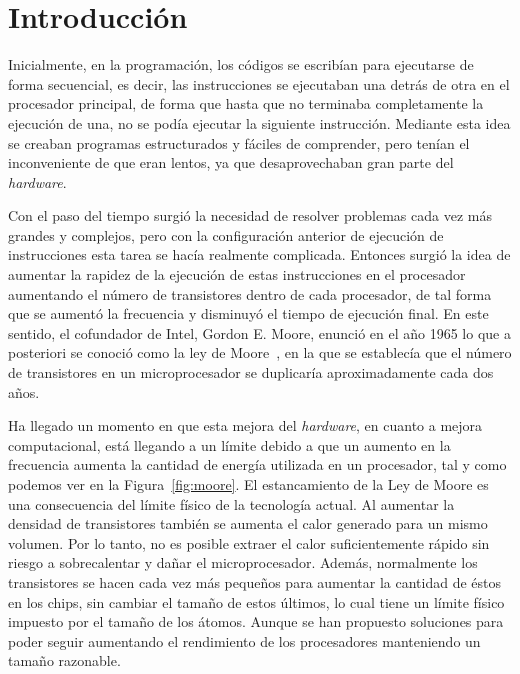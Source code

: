 \documentclass[a4paper,12pt]{article}
\begin{document}
\newpage

\tableofcontents
\thispagestyle{empty}

\newpage

\section{Introducción} \label{sec:introduccion}

Inicialmente, en la programación, los códigos se escribían para ejecutarse de forma secuencial, es decir, las instrucciones se ejecutaban una detrás de otra en el procesador principal, de forma que hasta que no terminaba completamente la ejecución de una, no se podía ejecutar la siguiente instrucción. Mediante esta idea se creaban programas estructurados y fáciles de comprender, pero tenían el inconveniente de que eran lentos, ya que desaprovechaban gran parte del {\it hardware}.

Con el paso del tiempo surgió la necesidad de resolver problemas cada vez más grandes y complejos, pero con la configuración anterior de ejecución de instrucciones esta tarea se hacía realmente complicada. Entonces surgió la idea de aumentar la rapidez de la ejecución de estas instrucciones en el procesador aumentando el número de transistores dentro de cada procesador, de tal forma que se aumentó la frecuencia y disminuyó el tiempo de ejecución final. En este sentido, el cofundador de Intel, Gordon E. Moore, enunció en el año 1965 lo que a posteriori se conoció como la ley de Moore~\cite{LeyMoore}, en la que se establecía que el número de transistores en un microprocesador se duplicaría aproximadamente cada dos años.

Ha llegado un momento en que esta mejora del {\it hardware}, en cuanto a mejora computacional, está llegando a un límite debido a que un aumento en la frecuencia aumenta la cantidad de energía utilizada en un procesador, tal y como podemos ver en la Figura~\ref{fig:moore}. El estancamiento de la Ley de Moore es una consecuencia del límite físico de la tecnología actual. Al aumentar la densidad de transistores también se aumenta el calor generado para un mismo volumen. Por lo tanto, no es posible extraer el calor suficientemente rápido sin riesgo a sobrecalentar y dañar el microprocesador. Además, normalmente los transistores se hacen cada vez más pequeños para aumentar la cantidad de éstos en los chips, sin cambiar el tamaño de estos últimos, lo cual tiene un límite físico impuesto por el tamaño de los átomos. Aunque se han propuesto soluciones para poder seguir aumentando el rendimiento de los procesadores manteniendo un tamaño razonable.
\end{document}
